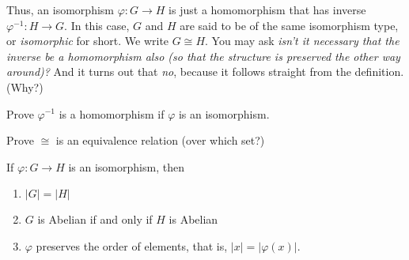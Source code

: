 \documentclass[11pt,a4paper]{article}
\begin{document}
Thus, an isomorphism \(\varphi\colon G\to H\) is just a homomorphism that has   inverse \(\varphi^{-1}\colon H\to G\).
In this case, \(G\) and \(H\) are said to be of the same isomorphism type, or \textit{isomorphic} for short. We write \(G\cong H\).
You may ask \textit{isn't  it necessary that  the inverse   be a homomorphism also (so that the structure is preserved the other way around)?}
And it turns out that \textit{no}, because it follows straight from the definition. (Why?)

\begin{eje}
    Prove \(\varphi^{-1}\) is a homomorphism if \(\varphi\) is an isomorphism.
\end{eje}

\begin{eje}
    Prove \(\cong\) is an equivalence relation (over which set?)
\end{eje}


\begin{lem}\label{lem:facts.pf.group.isomorphism}
    If \(\varphi\colon G\to H\) is an isomorphism, then 
    \begin{enumerate}[label=(\roman*)]
        \item \(|G| = |H|\)
        \item \(G\) is Abelian if and only if \(H\) is Abelian
        \item \(\varphi\) preserves the order of elements, that is, \(|x| = |\varphi(x)|\).
    \end{enumerate}
\end{lem}
\end{document}
